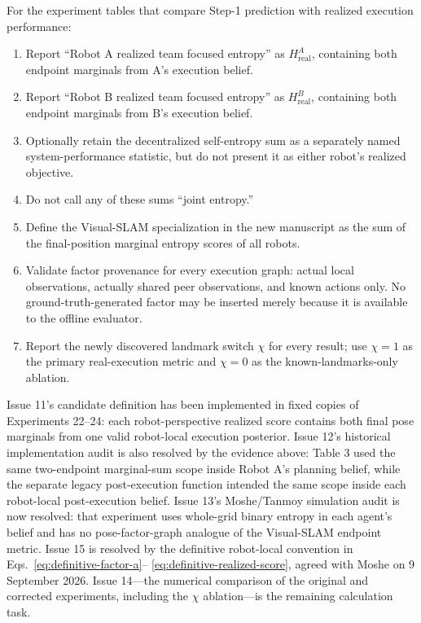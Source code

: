 \documentclass[11pt,a4paper]{article}
\begin{document}
For the experiment tables that compare Step-1 prediction with realized
execution performance:
\begin{enumerate}
  \item Report ``Robot A realized team focused entropy'' as
        $H_{\mathrm{real}}^A$, containing both endpoint marginals from A's
        execution belief.
  \item Report ``Robot B realized team focused entropy'' as
        $H_{\mathrm{real}}^B$, containing both endpoint marginals from B's
        execution belief.
  \item Optionally retain the decentralized self-entropy sum as a separately
        named system-performance statistic, but do not present it as either
        robot's realized objective.
  \item Do not call any of these sums ``joint entropy.''
  \item Define the Visual-SLAM specialization in the new manuscript as the sum
        of the final-position marginal entropy scores of all robots.
  \item Validate factor provenance for every execution graph: actual local
        observations, actually shared peer observations, and known actions
        only.  No ground-truth-generated factor may be inserted merely because
        it is available to the offline evaluator.
  \item Report the newly discovered landmark switch $\chi$ for every result;
        use $\chi=1$ as the primary real-execution metric and $\chi=0$ as the
        known-landmarks-only ablation.
\end{enumerate}

Issue 11's candidate definition has been implemented in fixed copies of
Experiments 22--24: each robot-perspective realized score contains both final
pose marginals from one valid robot-local execution posterior.  Issue 12's
historical implementation audit is also resolved by the evidence above:
Table 3 used the same two-endpoint marginal-sum scope inside Robot A's
planning belief, while the separate legacy post-execution function intended
the same scope inside each robot-local post-execution belief.  Issue 13's
Moshe/Tanmoy simulation audit is now resolved: that experiment uses whole-grid
binary entropy in each agent's belief and has no pose-factor-graph analogue of
the Visual-SLAM endpoint metric.  Issue 15 is resolved by the definitive
robot-local convention in Eqs.~\eqref{eq:definitive-factor-a}--
\eqref{eq:definitive-realized-score}, agreed with Moshe on 9 September 2026.
Issue 14---the numerical comparison of the original and corrected experiments,
including the $\chi$ ablation---is the remaining calculation task.
\end{document}
